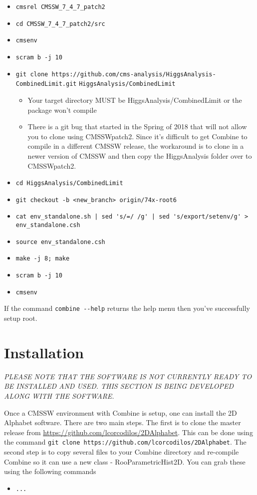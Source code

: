 \documentclass[letter]{article}
\begin{document}
    \begin{itemize}
        \item \verb"cmsrel CMSSW_7_4_7_patch2"
        \item \verb"cd CMSSW_7_4_7_patch2/src"
        \item \verb"cmsenv"
        \item \verb"scram b -j 10"
        \item \verb"git clone https://github.com/cms-analysis/HiggsAnalysis-CombinedLimit.git" \verb"HiggsAnalysis/CombinedLimit"
        \begin{itemize}
            \item Your target directory MUST be HiggsAnalysis/CombinedLimit or the package won't compile
            \item There is a git bug that started in the Spring of 2018 that will not allow you to clone using CMSSW\textunderscore patch2. Since it's difficult to get Combine to compile in a different CMSSW release, the workaround is to clone in a newer version of CMSSW and then copy the HiggsAnalysis folder over to CMSSW\textunderscore patch2.
        \end{itemize}
        \item \verb"cd HiggsAnalysis/CombinedLimit"
        \item \verb"git checkout -b <new_branch> origin/74x-root6"
        \item \verb"cat env_standalone.sh | sed 's/=/ /g' | sed 's/export/setenv/g' > env_standalone.csh"
        \item \verb"source env_standalone.csh"
        \item \verb"make -j 8; make"
        \item \verb"scram b -j 10"
        \item \verb"cmsenv"
    \end{itemize}

    If the command \verb"combine --help" returns the help menu then you've successfully setup root.

\section{Installation}
    \textit{PLEASE NOTE THAT THE SOFTWARE IS NOT CURRENTLY READY TO BE INSTALLED AND USED. THIS SECTION IS BEING DEVELOPED ALONG WITH THE SOFTWARE.}

    Once a CMSSW environment with Combine is setup, one can install the 2D Alphabet software. There are two main steps. The first is to clone the master release from \url{https://github.com/lcorcodilos/2DAlphabet}. This can be done using the command \verb"git clone https://github.com/lcorcodilos/2DAlphabet". The second step is to copy several files to your Combine directory and re-compile Combine so it can use a new class - RooParametricHist2D. You can grab these using the following commands
    \begin{itemize}
        \item \verb"..."
    \end{itemize}
\end{document}
